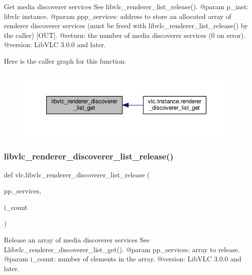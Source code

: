 \begin{DoxyVerb}Get media discoverer services
See libvlc_renderer_list_release().
@param p_inst: libvlc instance.
@param ppp_services: address to store an allocated array of renderer discoverer services (must be freed with libvlc_renderer_list_release() by the caller) [OUT].
@return: the number of media discoverer services (0 on error).
@version: LibVLC 3.0.0 and later.
\end{DoxyVerb}
 Here is the caller graph for this function\+:
\nopagebreak
\begin{figure}[H]
\begin{center}
\leavevmode
\includegraphics[width=350pt]{namespacevlc_af59f382bb827e83d0dfa826e209d12ef_icgraph}
\end{center}
\end{figure}
\mbox{\label{namespacevlc_af443e940d4a3485bd04c20d1895b57f7}} 
\subsubsection{\texorpdfstring{libvlc\+\_\+renderer\+\_\+discoverer\+\_\+list\+\_\+release()}{libvlc\_renderer\_discoverer\_list\_release()}}
{\footnotesize\ttfamily def vlc.\+libvlc\+\_\+renderer\+\_\+discoverer\+\_\+list\+\_\+release (\begin{DoxyParamCaption}\item[{}]{pp\+\_\+services,  }\item[{}]{i\+\_\+count }\end{DoxyParamCaption})}

\begin{DoxyVerb}Release an array of media discoverer services
See L{libvlc_renderer_discoverer_list_get}().
@param pp_services: array to release.
@param i_count: number of elements in the array.
@version: LibVLC 3.0.0 and later.
\end{DoxyVerb}
 \mbox{\label{namespacevlc_a3f696d66405b9f0cf8d2c6932f763cfa}} 
